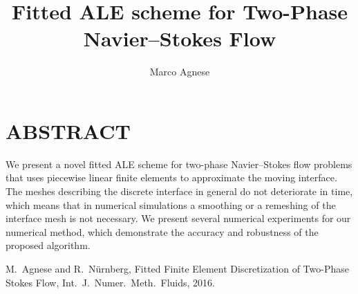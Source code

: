 \documentclass{smpstyle}
\title{Fitted ALE scheme for Two-Phase Navier--Stokes Flow}
\author{Marco Agnese}
\begin{document}
\maketitle

\section*{ABSTRACT}


We present a novel fitted ALE scheme for two-phase Navier--Stokes flow problems
that uses piecewise linear finite elements to approximate the moving interface.
The meshes describing the discrete interface in general do not deteriorate in
time, which means that in numerical simulations a smoothing or a remeshing of
the interface mesh is not necessary. We present several numerical experiments 
for our numerical method, which demonstrate the accuracy and
robustness of the proposed algorithm.

\begin{thebibliography}{99}
M.~Agnese and R.~N\"urnberg, Fitted Finite Element Discretization of Two-Phase 
{S}tokes Flow, Int.\ J.\ Numer.\ Meth.\ Fluids, 2016.

\end{thebibliography}
\end{document}
